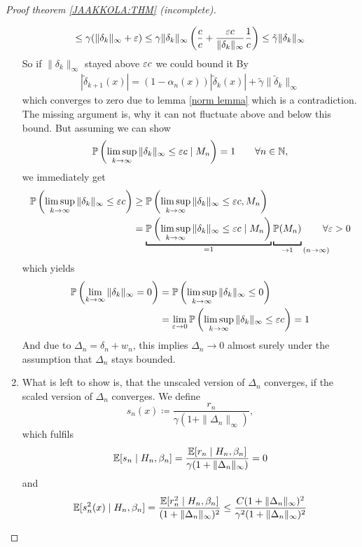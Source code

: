 \begin{proof}[Proof theorem \ref{JAAKKOLA:THM} (incomplete)]
\begin{enumerate}[label= Step \arabic*:, ref= Step \arabic*, leftmargin=0pt]
\[        \le \gamma (\|\delta_k\|_\infty + \varepsilon)
        \le \gamma \|\delta_k\|_\infty \left(
            \frac{c}{c} + \frac{\varepsilon c}{\|\delta_k\|_\infty} \frac{1}{c}
        \right)
        \le \tilde{\gamma} \|\delta_k\|_\infty
    \]
    So if \(\|\delta_k\|_\infty\) stayed above \(\varepsilon c\) we could bound it By
    \begin{align}\label{making it scale invariant}
        |\tilde{\delta}_{k+1}(x)|= (1-\alpha_n(x))|\tilde{\delta}_k(x)|+\tilde{\gamma} \|\tilde{\delta}_k\|_\infty 
    \end{align}
    which converges to zero due to lemma \ref{norm lemma} which is a contradiction. The missing argument is, why it can not fluctuate above and below this bound. But assuming we can show
    \[
        \mathbb{P}\left(\limsup_{k\to\infty} \|\delta_k\|_\infty \le \varepsilon c \mid M_n \right)=1 \qquad \forall n\in\mathbb{N},
    \]
    we immediately get
    \begin{align*}
        \Pr\left(\limsup_{k\to\infty} \|\delta_k\|_\infty \le \vep c\right)
        &\ge \Pr\left(\limsup_{k\to\infty} \|\delta_k\|_\infty \le \vep c , M_n \right)\\
        &=\underbracket[1pt]{
            \Pr\left(\limsup_{k\to\infty} \|\delta_k\|_\infty \le \vep c \mid M_n \right)
        }_{=1} \underbracket[1pt]{\vphantom{\sup_{k}}\Pr(M_n)}_{
            \to 1 \mathrlap{\quad (n\to \infty)}
        } \qquad \forall \vep >0
    \end{align*}
    which yields
    \begin{align*}
        \mathbb{P}\left(\lim_{k\to\infty} \|\delta_k\|_\infty = 0 \right)
        &=\mathbb{P}\left(\limsup_{k\to\infty} \|\delta_k\|_\infty \le 0 \right)\\
        &=\lim_{\varepsilon\to 0} \mathbb{P}\left(\limsup_{k\to\infty} \|\delta_k\|_\infty \le \varepsilon c \right)=1
    \end{align*}
    And due to \(\Delta_n=\delta_n+w_n\), this implies \(\Delta_n\to 0\) almost surely under the assumption that \(\Delta_n\) stays bounded. 
    \item What is left to show is, that the unscaled version of \(\Delta_n\) converges, if the scaled version of \(\Delta_n\) converges. We define
    \[
        s_n(x)\coloneqq \frac{r_n}{\gamma(1+\|\Delta_n\|_\infty)},
    \]
    which fulfils
    \[
        \mathbb{E}[s_n \mid H_n,\beta_n]=\frac{\mathbb{E}[r_n\mid H_n,\beta_n]}{\gamma (1+\|\Delta_n\|_\infty)}=0
    \]
    and
    \[
        \mathbb{E}[s_n^2(x)\mid H_n,\beta_n]
        =\frac{\mathbb{E}[r_n^2\mid H_n,\beta_n]}{(1+\|\Delta_n\|_\infty)^2}
        \le \frac{C(1+\|\Delta_n\|_\infty)^2 }{\gamma^2(1+\|\Delta_n\|_\infty)^2}
\]
\end{enumerate}
\end{proof}
